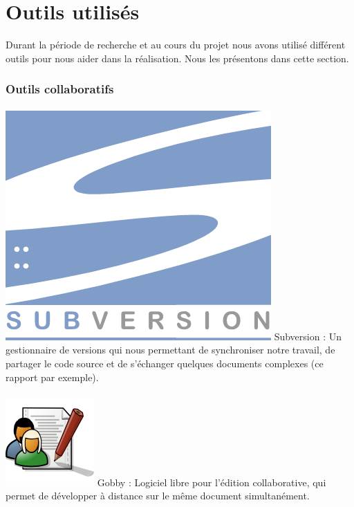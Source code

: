 \documentclass{report}
\begin{document}
		\section{Outils utilisés}
		Durant la période de recherche et au cours du projet nous avons utilisé différent outils pour nous aider dans la réalisation. Nous les présentons dans cette section. \\
		
			\subsubsection{Outils collaboratifs}
			\paragraph{}
			\includegraphics[scale=1]{../logos/subversion-logo.png} 
			Subversion : Un gestionnaire de versions qui nous permettant de synchroniser notre travail, de partager le code source et de s'échanger quelques documents complexes (ce rapport par exemple).
			\paragraph{}
			\includegraphics[scale=0.25]{../logos/Gobby-logo.png} 
			Gobby :
			Logiciel libre pour l'édition collaborative, qui permet de développer à distance sur le même document simultanément. \\
\end{document}
